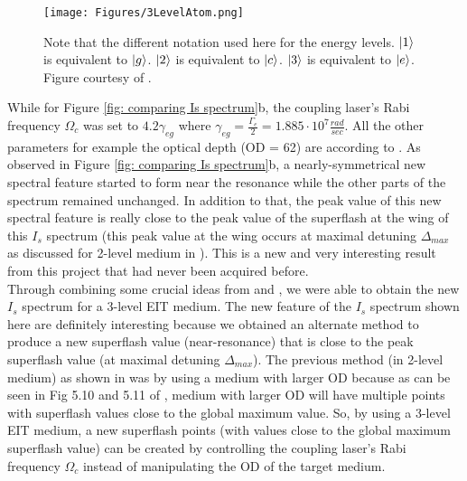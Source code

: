\newpage

\begin{figure}[h!]
    \centering
    \texttt{[image: Figures/3LevelAtom.png]}
    \caption{Note that the different notation used here for the energy levels. $\ket{1}$ is equivalent to $\ket{g}$. $\ket{2}$ is equivalent to $\ket{c}$. $\ket{3}$ is equivalent to $\ket{e}$. Figure courtesy of \cite{Jeong2009}.}
    \label{fig: 3LevelAtom}
\end{figure}

While for Figure \ref{fig: comparing Is spectrum}b, the coupling laser's Rabi frequency $\Omega_{c}$ was set to $4.2\gamma_{eg}$ where $\gamma_{eg} = \frac{\Gamma_{e}}{2} = 1.885 \cdot 10^{7} \frac{rad}{sec}$. All the other parameters for example the optical depth (OD = 62) are according to \cite{jeong2010slow}. As observed in Figure \ref{fig: comparing Is spectrum}b, a nearly-symmetrical new spectral feature started to form near the resonance while the other parts of the spectrum remained unchanged. In addition to that, the peak value of this new spectral feature is really close to the peak value of the superflash at the wing of this $I_{s}$ spectrum (this peak value at the wing occurs at maximal detuning $\Delta_{max}$ as discussed for 2-level medium in \cite{Kwong2017}). This is a new and very interesting result from this project that had never been acquired before.\\

Through combining some crucial ideas from \cite{Kwong2014} and \cite{jeong2010slow}, we were able to obtain the new $I_{s}$ spectrum for a 3-level EIT medium. The new feature of the $I_{s}$ spectrum shown here are definitely interesting because we obtained an alternate method to produce a new superflash value (near-resonance) that is close to the peak superflash value (at maximal detuning $\Delta_{max}$). The previous method (in 2-level medium) as shown in \cite{Kwong2017} was by using a medium with larger OD because as can be seen in Fig 5.10 and 5.11 of \cite{Kwong2017}, medium with larger OD will have multiple points with superflash values close to the global maximum value. So, by using a 3-level EIT medium, a new superflash points (with values close to the global maximum superflash value) can be created by controlling the coupling laser's Rabi frequency $\Omega_{c}$ instead of manipulating the OD of the target medium.


